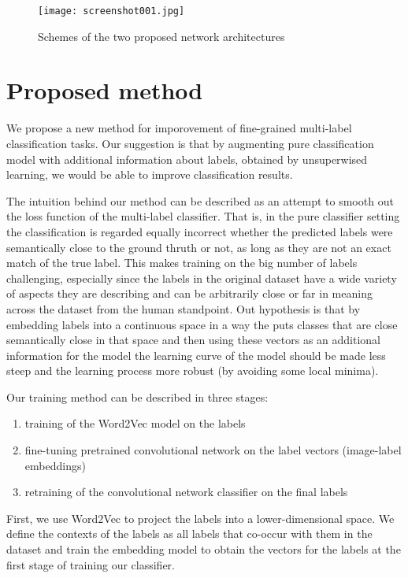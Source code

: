 \documentclass[10pt,twocolumn,letterpaper]{article}
\begin{document}
\begin{figure}[!ht]
	\texttt{[image: screenshot001.jpg]}
	\centering
	\caption{Schemes of the two proposed network architectures}\label{fig:arch}
\end{figure}
\section{Proposed method}
We propose a new method for imporovement of fine-grained multi-label classification tasks. Our suggestion is that by augmenting pure classification model with additional information about labels, obtained by unsuperwised learning, we would be able to improve classification results.
\par The intuition behind our method can be described as an attempt to smooth out the loss function of the multi-label classifier. That is, in the pure classifier setting the classification is regarded equally incorrect whether the predicted labels were semantically close to the ground thruth or not, as long as they are not an exact match of the true label. This makes training on the big number of labels challenging, especially since the labels in the original dataset have a wide variety of aspects they are describing and can be arbitrarily close or far in meaning across the dataset from the human standpoint. Out hypothesis is that by embedding labels into a continuous space in a way the puts classes that are close semantically close in that space and then using these vectors as an additional information for the model the learning curve of the model should be made less steep and the learning process more robust (by avoiding some local minima).
\par Our training method can be described in three stages:
\begin{enumerate}
	\item training of the Word2Vec \cite{mikolov2013efficient} model on the labels
	\item fine-tuning pretrained convolutional network on the label vectors (image-label embeddings)
	\item retraining of the convolutional network classifier on the final labels
\end{enumerate}
\par First, we use Word2Vec to project the labels into a lower-dimensional space. We define the contexts of the labels as all labels that co-occur with them in the dataset and train the embedding model to obtain the vectors for the labels at the first stage of training our classifier.
\end{document}
